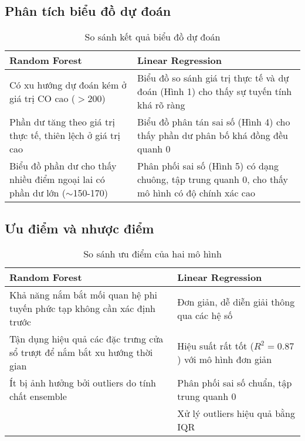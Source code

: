 \subsection{Phân tích biểu đồ dự đoán}

\begin{table}[H]
\centering
\caption{So sánh kết quả biểu đồ dự đoán}
\begin{tabular}{p{7cm}|p{7cm}}
\toprule
\textbf{Random Forest} & \textbf{Linear Regression} \\
\midrule
Có xu hướng dự đoán kém ở giá trị CO cao ($>$200) & Biểu đồ so sánh giá trị thực tế và dự đoán (Hình 1) cho thấy sự tuyến tính khá rõ ràng \\
\midrule
Phần dư tăng theo giá trị thực tế, thiên lệch ở giá trị cao & Biểu đồ phân tán sai số (Hình 4) cho thấy phần dư phân bố khá đồng đều quanh 0 \\
\midrule
Biểu đồ phần dư cho thấy nhiều điểm ngoại lai có phần dư lớn ($\sim$150-170) & Phân phối sai số (Hình 5) có dạng chuông, tập trung quanh 0, cho thấy mô hình có độ chính xác cao \\
\bottomrule
\end{tabular}
\end{table}

\subsection{Ưu điểm và nhược điểm}

\begin{table}[h]
\centering
\caption{So sánh ưu điểm của hai mô hình}
\begin{tabular}{p{7cm}|p{7cm}}
\toprule
\textbf{Random Forest} & \textbf{Linear Regression} \\
\midrule
Khả năng nắm bắt mối quan hệ phi tuyến phức tạp không cần xác định trước & Đơn giản, dễ diễn giải thông qua các hệ số \\
\midrule
Tận dụng hiệu quả các đặc trưng cửa sổ trượt để nắm bắt xu hướng thời gian & Hiệu suất rất tốt ($R^2 = 0.87$) với mô hình đơn giản \\
\midrule
Ít bị ảnh hưởng bởi outliers do tính chất ensemble & Phân phối sai số chuẩn, tập trung quanh 0 \\
\midrule
 & Xử lý outliers hiệu quả bằng IQR \\
\bottomrule
\end{tabular}
\end{table}

